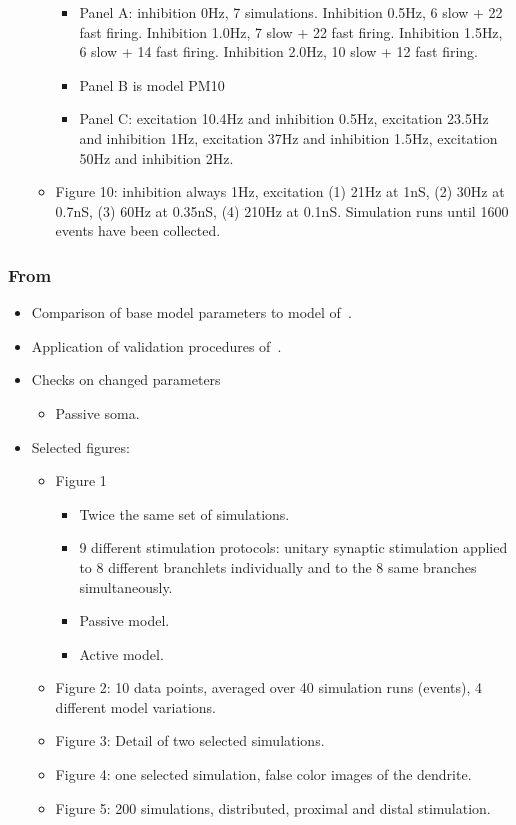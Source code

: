 \documentclass[12pt]{article}
\begin{document}
\begin{itemize}
\begin{itemize}
\begin{itemize}
    \item Panel A: inhibition 0Hz, 7 simulations.  Inhibition 0.5Hz, 6
      slow + 22 fast firing.  Inhibition 1.0Hz, 7 slow + 22 fast
      firing.  Inhibition 1.5Hz, 6 slow + 14 fast firing.  Inhibition
      2.0Hz, 10 slow + 12 fast firing.
    \item Panel B is model PM10
    \item Panel C: excitation 10.4Hz and inhibition 0.5Hz, excitation
      23.5Hz and inhibition 1Hz, excitation 37Hz and inhibition 1.5Hz,
      excitation 50Hz and inhibition 2Hz.
    \end{itemize}
  \item Figure 10: inhibition always 1Hz, excitation (1) 21Hz at 1nS,
    (2) 30Hz at 0.7nS, (3) 60Hz at 0.35nS, (4) 210Hz at 0.1nS.
    Simulation runs until 1600 events have been collected.
  \end{itemize}
\end{itemize}

\subsubsection*{From~\cite{schutter94:_simul_purkin}}

\begin{itemize}
\item Comparison of base model parameters to model of~\cite{E:1994hc}.
\item Application of validation procedures
  of~\cite{De-Schutter-E:1994vn}.
\item Checks on changed parameters
  \begin{itemize}
  \item Passive soma.
  \end{itemize}
\item Selected figures:
  \begin{itemize}
  \item Figure 1
    \begin{itemize}
    \item Twice the same set of simulations.
    \item 9 different stimulation protocols: unitary synaptic
      stimulation applied to 8 different branchlets individually and
      to the 8 same branches simultaneously.
    \item Passive model.
    \item Active model.
    \end{itemize}
  \item Figure 2: 10 data points, averaged over 40 simulation runs
    (events), 4 different model variations.
  \item Figure 3: Detail of two selected simulations.
  \item Figure 4: one selected simulation, false color images of the
    dendrite.
  \item Figure 5: 200 simulations, distributed, proximal and distal
    stimulation.
  \end{itemize}
\end{itemize}
\end{document}
